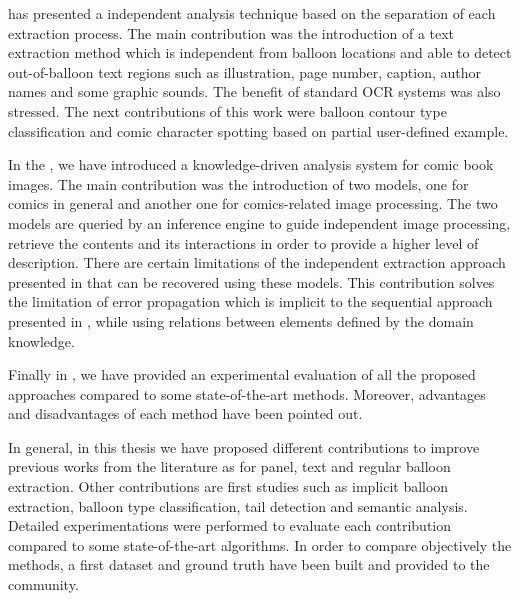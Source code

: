  has presented a independent analysis technique based on the separation of each extraction process.
The main contribution was the introduction of a text extraction method which is independent from balloon locations and able to detect out-of-balloon text regions such as illustration, page number, caption, author names and some graphic sounds.
The benefit of standard OCR systems was also stressed.
The next contributions of this work were balloon contour type classification and comic character spotting based on partial user-defined example.

In the , we have introduced a knowledge-driven analysis system for comic book images.
The main contribution was the introduction of two models, one for comics in general and another one for comics-related image processing.
The two models are queried by an inference engine to guide independent image processing, retrieve the contents and its interactions in order to provide a higher level of description.
There are certain limitations of the independent extraction approach presented in  that can be recovered using these models.
This contribution solves the limitation of error propagation which is implicit to the sequential approach presented in , while using relations between elements defined by the domain knowledge.

Finally in , we have provided an experimental evaluation of all the proposed approaches compared to some state-of-the-art methods.
Moreover, advantages and disadvantages of each method have been pointed out.

In general, in this thesis we have proposed different contributions to improve previous works from the literature as for panel, text and regular balloon extraction.
Other contributions are first studies such as implicit balloon extraction, balloon type classification, tail detection and semantic analysis.
Detailed experimentations were performed to evaluate each contribution compared to some state-of-the-art algorithms.
In order to compare objectively the methods, a first dataset and ground truth have been built and provided to the community.

